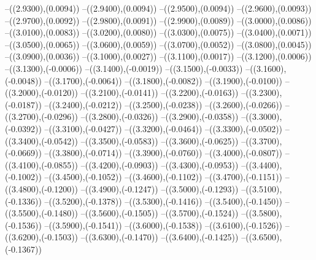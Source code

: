 {	--({\sx*(2.9300)},{\sy*(0.0094)})
	--({\sx*(2.9400)},{\sy*(0.0094)})
	--({\sx*(2.9500)},{\sy*(0.0094)})
	--({\sx*(2.9600)},{\sy*(0.0093)})
	--({\sx*(2.9700)},{\sy*(0.0092)})
	--({\sx*(2.9800)},{\sy*(0.0091)})
	--({\sx*(2.9900)},{\sy*(0.0089)})
	--({\sx*(3.0000)},{\sy*(0.0086)})
	--({\sx*(3.0100)},{\sy*(0.0083)})
	--({\sx*(3.0200)},{\sy*(0.0080)})
	--({\sx*(3.0300)},{\sy*(0.0075)})
	--({\sx*(3.0400)},{\sy*(0.0071)})
	--({\sx*(3.0500)},{\sy*(0.0065)})
	--({\sx*(3.0600)},{\sy*(0.0059)})
	--({\sx*(3.0700)},{\sy*(0.0052)})
	--({\sx*(3.0800)},{\sy*(0.0045)})
	--({\sx*(3.0900)},{\sy*(0.0036)})
	--({\sx*(3.1000)},{\sy*(0.0027)})
	--({\sx*(3.1100)},{\sy*(0.0017)})
	--({\sx*(3.1200)},{\sy*(0.0006)})
	--({\sx*(3.1300)},{\sy*(-0.0006)})
	--({\sx*(3.1400)},{\sy*(-0.0019)})
	--({\sx*(3.1500)},{\sy*(-0.0033)})
	--({\sx*(3.1600)},{\sy*(-0.0048)})
	--({\sx*(3.1700)},{\sy*(-0.0064)})
	--({\sx*(3.1800)},{\sy*(-0.0082)})
	--({\sx*(3.1900)},{\sy*(-0.0100)})
	--({\sx*(3.2000)},{\sy*(-0.0120)})
	--({\sx*(3.2100)},{\sy*(-0.0141)})
	--({\sx*(3.2200)},{\sy*(-0.0163)})
	--({\sx*(3.2300)},{\sy*(-0.0187)})
	--({\sx*(3.2400)},{\sy*(-0.0212)})
	--({\sx*(3.2500)},{\sy*(-0.0238)})
	--({\sx*(3.2600)},{\sy*(-0.0266)})
	--({\sx*(3.2700)},{\sy*(-0.0296)})
	--({\sx*(3.2800)},{\sy*(-0.0326)})
	--({\sx*(3.2900)},{\sy*(-0.0358)})
	--({\sx*(3.3000)},{\sy*(-0.0392)})
	--({\sx*(3.3100)},{\sy*(-0.0427)})
	--({\sx*(3.3200)},{\sy*(-0.0464)})
	--({\sx*(3.3300)},{\sy*(-0.0502)})
	--({\sx*(3.3400)},{\sy*(-0.0542)})
	--({\sx*(3.3500)},{\sy*(-0.0583)})
	--({\sx*(3.3600)},{\sy*(-0.0625)})
	--({\sx*(3.3700)},{\sy*(-0.0669)})
	--({\sx*(3.3800)},{\sy*(-0.0714)})
	--({\sx*(3.3900)},{\sy*(-0.0760)})
	--({\sx*(3.4000)},{\sy*(-0.0807)})
	--({\sx*(3.4100)},{\sy*(-0.0855)})
	--({\sx*(3.4200)},{\sy*(-0.0903)})
	--({\sx*(3.4300)},{\sy*(-0.0953)})
	--({\sx*(3.4400)},{\sy*(-0.1002)})
	--({\sx*(3.4500)},{\sy*(-0.1052)})
	--({\sx*(3.4600)},{\sy*(-0.1102)})
	--({\sx*(3.4700)},{\sy*(-0.1151)})
	--({\sx*(3.4800)},{\sy*(-0.1200)})
	--({\sx*(3.4900)},{\sy*(-0.1247)})
	--({\sx*(3.5000)},{\sy*(-0.1293)})
	--({\sx*(3.5100)},{\sy*(-0.1336)})
	--({\sx*(3.5200)},{\sy*(-0.1378)})
	--({\sx*(3.5300)},{\sy*(-0.1416)})
	--({\sx*(3.5400)},{\sy*(-0.1450)})
	--({\sx*(3.5500)},{\sy*(-0.1480)})
	--({\sx*(3.5600)},{\sy*(-0.1505)})
	--({\sx*(3.5700)},{\sy*(-0.1524)})
	--({\sx*(3.5800)},{\sy*(-0.1536)})
	--({\sx*(3.5900)},{\sy*(-0.1541)})
	--({\sx*(3.6000)},{\sy*(-0.1538)})
	--({\sx*(3.6100)},{\sy*(-0.1526)})
	--({\sx*(3.6200)},{\sy*(-0.1503)})
	--({\sx*(3.6300)},{\sy*(-0.1470)})
	--({\sx*(3.6400)},{\sy*(-0.1425)})
	--({\sx*(3.6500)},{\sy*(-0.1367)})
}
